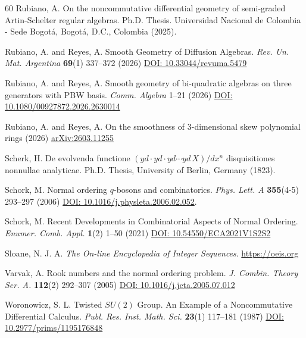 \documentclass{amsart}
\theoremstyle{definition}
\theoremstyle{remark}
\numberwithin{equation}{section}
\begin{document}
\begin{thebibliography}{60}
 Rubiano, A. On the noncommutative differential geometry of semi-graded Artin-Schelter regular algebras. Ph.D. Thesis. Universidad Nacional de Colombia - Sede Bogot\'a, Bogot\'a, D.C., Colombia (2025).

 Rubiano, A. and Reyes, A. Smooth Geometry of Diffusion Algebras. {\em Rev. Un. Mat. Argentina} {\bf 69}(1) 337--372 (2026) \href{https://doi.org/10.33044/revuma.5479}{DOI: 10.33044/revuma.5479}

 Rubiano, A. and Reyes, A. Smooth geometry of bi-quadratic algebras on three generators with PBW basis. {\em Comm. Algebra} 1--21 (2026) \href{https://doi.org/10.1080/00927872.2026.2630014}{DOI: 10.1080/00927872.2026.2630014}

 Rubiano, A. and Reyes, A. On the smoothness of 3-dimensional skew polynomial rings (2026) \href{https://arxiv.org/abs/2603.11255}{arXiv:2603.11255}

 Scherk, H. De evolvenda functione $(yd \cdot yd \cdot yd \dotsb yd\, X)/dx^n$ disquisitiones nonnullae analyticae. Ph.D. Thesis, University of Berlin, Germany (1823).

 Schork, M. Normal ordering $q$-bosons and combinatorics. {\em Phys. Lett. A} {\bf 355}(4-5) 293--297 (2006) \href{https://doi.org/10.1016/j.physleta.2006.02.052}{DOI: 10.1016/j.physleta.2006.02.052}.

 Schork, M. Recent Developments in Combinatorial Aspects of Normal Ordering. {\em Enumer. Comb. Appl.} {\bf 1}(2) 1--50 (2021) \href{https://doi.org/10.54550/ECA2021V1S2S2}{DOI: 10.54550/ECA2021V1S2S2}

 Sloane, N. J. A. {\em The On-line Encyclopedia of Integer Sequences}. \href{https://oeis.org}{https://oeis.org}

 Varvak, A. Rook numbers and the normal ordering problem. {\em J. Combin. Theory Ser. A.} {\bf 112}(2) 292--307 (2005) \href{https://doi.org/10.1016/j.jcta.2005.07.012}{DOI: 10.1016/j.jcta.2005.07.012}

 Woronowicz, S. L. Twisted $SU(2)$ {G}roup. An {E}xample of a {N}oncommutative {D}ifferential {C}alculus. {\em Publ. Res. Inst. Math. Sci.} {\bf 23}(1) 117--181 (1987) \href{https://ems.press/journals/prims/articles/3332}{DOI: 10.2977/prims/1195176848}


\end{thebibliography}
\end{document}
